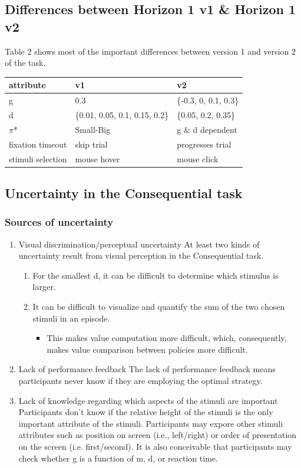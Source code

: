 \documentclass[11pt]{article}
\begin{document}
\subsection{Differences between Horizon 1 v1 \& Horizon 1 v2}
\label{sec:orgb625c22}
Table 2 shows most of the important differences between version 1 and version 2 of the task.
\begin{table}[htbp]
\label{Table 2}
\centering
\begin{tabular}{lll}
attribute & v1 & v2\\
\hline
g & 0.3 & \{-0.3, 0, 0.1, 0.3\}\\
d & \{0.01, 0.05, 0.1, 0.15, 0.2\} & \{0.05, 0.2, 0.35\}\\
\(\pi\)* & Small-Big & g \& d dependent\\
fixation timeout & skip trial & progresses trial\\
stimuli selection & mouse hover & mouse click\\
\end{tabular}
\end{table}
\subsection{Uncertainty in the Consequential task}
\label{sec:org7c00e46}
\subsubsection{Sources of uncertainty}
\label{sec:org5edd91d}
\begin{enumerate}
\item Visual discrimination/perceptual uncertainty
\label{sec:org618cba6}
At least two kinds of uncertainty result from visual perception in the Consequential task.
\begin{enumerate}
\item For the smallest d, it can be difficult to determine which stimulus is larger.
\item It can be difficult to visualize and quantify the sum of the two chosen stimuli in an episode.
\begin{itemize}
\item This makes value computation more difficult, which, consequently, makes value comparison between policies more difficult.
\end{itemize}
\end{enumerate}
\item Lack of performance feedback
\label{sec:orgb84a032}
The lack of performance feedback means participants never know if they are employing the optimal strategy.
\item Lack of knowledge regarding which aspects of the stimuli are important
\label{sec:org710cd24}
Participants don't know if the relative height of the stimuli is the only important attribute of the stimuli. Participants may expore other stimuli attributes such as position on screen (i.e., left/right) or order of presentation on the screen (i.e. first/second). It is also conceivable that participants may check whether g is a function of m, d, or reaction time.
\end{enumerate}
\end{document}
